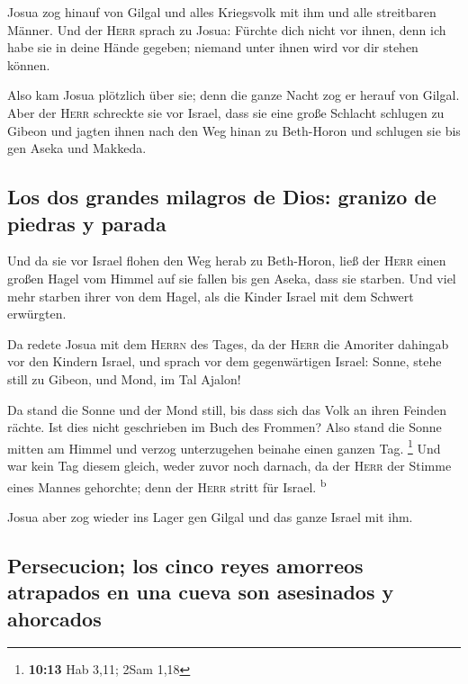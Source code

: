  Josua zog hinauf von Gilgal und alles Kriegsvolk mit ihm
und alle streitbaren Männer.  Und der \textsc{Herr} sprach
zu Josua: Fürchte dich nicht vor ihnen, denn ich habe sie in deine Hände
gegeben; niemand unter ihnen wird vor dir stehen können.

 Also kam Josua plötzlich über sie; denn die ganze Nacht
zog er herauf von Gilgal.  Aber der \textsc{Herr}
schreckte sie vor Israel, dass sie eine große Schlacht schlugen zu
Gibeon und jagten ihnen nach den Weg hinan zu Beth-Horon und schlugen
sie bis gen Aseka und Makkeda.

\hypertarget{los-dos-grandes-milagros-de-dios-granizo-de-piedras-y-parada}{%
\subsection{Los dos grandes milagros de Dios: granizo de piedras y
parada}\label{los-dos-grandes-milagros-de-dios-granizo-de-piedras-y-parada}}

 Und da sie vor Israel flohen den Weg herab zu
Beth-Horon, ließ der \textsc{Herr} einen großen Hagel vom Himmel auf sie
fallen bis gen Aseka, dass sie starben. Und viel mehr starben ihrer von
dem Hagel, als die Kinder Israel mit dem Schwert erwürgten.

 Da redete Josua mit dem \textsc{Herrn} des Tages, da der
\textsc{Herr} die Amoriter dahingab vor den Kindern Israel, und sprach
vor dem gegenwärtigen Israel: Sonne, stehe still zu Gibeon, und Mond, im
Tal Ajalon!

 Da stand die Sonne und der Mond still, bis dass sich das
Volk an ihren Feinden rächte. Ist dies nicht geschrieben im Buch des
Frommen? Also stand die Sonne mitten am Himmel und verzog unterzugehen
beinahe einen ganzen Tag. \footnote{\textbf{10:13} Hab 3,11; 2Sam 1,18}
 Und war kein Tag diesem gleich, weder zuvor noch
darnach, da der \textsc{Herr} der Stimme eines Mannes gehorchte; denn
der \textsc{Herr} stritt für Israel. \textsuperscript{b}

 Josua aber zog wieder ins Lager gen Gilgal und das ganze
Israel mit ihm.

\hypertarget{persecucion-los-cinco-reyes-amorreos-atrapados-en-una-cueva-son-asesinados-y-ahorcados}{%
\subsection{Persecucion; los cinco reyes amorreos atrapados en una cueva
son asesinados y
ahorcados}\label{persecucion-los-cinco-reyes-amorreos-atrapados-en-una-cueva-son-asesinados-y-ahorcados}}

